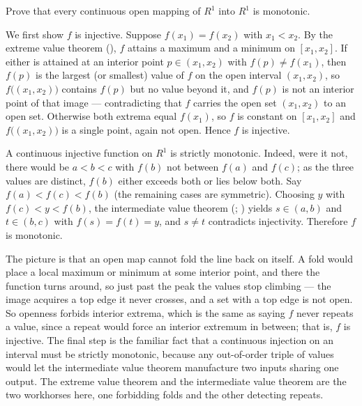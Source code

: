 \documentclass[main.tex]{subfiles}
\begin{document}
Prove that every continuous open mapping of $R^{1}$ into $R^{1}$ is monotonic.
\begin{SolutionBlue}
We first show $f$ is injective. Suppose $f(x_{1}) = f(x_{2})$ with $x_{1} < x_{2}$. By the extreme value theorem (), $f$ attains a maximum and a minimum on $[x_{1}, x_{2}]$. If either is attained at an interior point $p \in (x_{1}, x_{2})$ with $f(p) \ne f(x_{1})$, then $f(p)$ is the largest (or smallest) value of $f$ on the open interval $(x_{1}, x_{2})$, so $f\big((x_{1}, x_{2})\big)$ contains $f(p)$ but no value beyond it, and $f(p)$ is not an interior point of that image --- contradicting that $f$ carries the open set $(x_{1}, x_{2})$ to an open set. Otherwise both extrema equal $f(x_{1})$, so $f$ is constant on $[x_{1}, x_{2}]$ and $f\big((x_{1}, x_{2})\big)$ is a single point, again not open. Hence $f$ is injective.

A continuous injective function on $R^{1}$ is strictly monotonic. Indeed, were it not, there would be $a < b < c$ with $f(b)$ not between $f(a)$ and $f(c)$; as the three values are distinct, $f(b)$ either exceeds both or lies below both. Say $f(a) < f(c) < f(b)$ (the remaining cases are symmetric). Choosing $y$ with $f(c) < y < f(b)$, the intermediate value theorem (; ) yields $s \in (a, b)$ and $t \in (b, c)$ with $f(s) = f(t) = y$, and $s \ne t$ contradicts injectivity. Therefore $f$ is monotonic.
\end{SolutionBlue}
\begin{Reflection}
The picture is that an open map cannot fold the line back on itself. A fold would place a local maximum or minimum at some interior point, and there the function turns around, so just past the peak the values stop climbing --- the image acquires a top edge it never crosses, and a set with a top edge is not open. So openness forbids interior extrema, which is the same as saying $f$ never repeats a value, since a repeat would force an interior extremum in between; that is, $f$ is injective. The final step is the familiar fact that a continuous injection on an interval must be strictly monotonic, because any out-of-order triple of values would let the intermediate value theorem manufacture two inputs sharing one output. The extreme value theorem and the intermediate value theorem are the two workhorses here, one forbidding folds and the other detecting repeats.
\end{Reflection}
\end{document}
